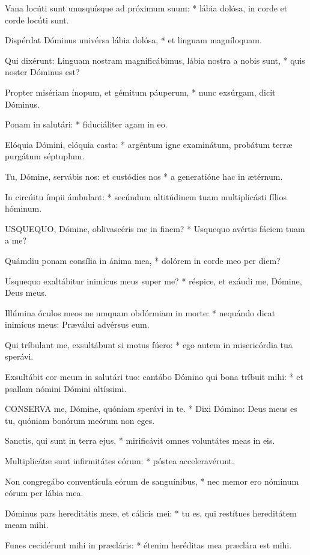 Vana locúti sunt unusquísque ad próximum suum: * lábia dolósa, in corde et corde locúti sunt.

Dispérdat Dóminus univérsa lábia dolósa, * et linguam magníloquam.

Qui dixérunt: Linguam nostram magnificábimus, lábia nostra a nobis sunt, * quis noster Dóminus est?

Propter misériam ínopum, et gémitum páuperum, * nunc exsúrgam, dicit Dóminus.

Ponam in salutári: * fiduciáliter agam in eo.

Elóquia Dómini, elóquia casta: * argéntum igne examinátum, probátum terræ purgátum séptuplum.

Tu, Dómine, servábis nos: et custódies nos * a generatióne hac in ætérnum.

In circúitu ímpii ámbulant: * secúndum altitúdinem tuam multiplicásti fílios hóminum.


\lettrine[lines=2]{U}{SQUEQUO}, Dómine, oblivascéris me in finem? * Usquequo avértis fáciem tuam a me?

Quámdiu ponam consília in ánima mea, * dolórem in corde meo per diem?

Usquequo exaltábitur inimícus meus super me? * réspice, et exáudi me, Dómine, Deus meus.

Illúmina óculos meos ne umquam obdórmiam in morte: * nequándo dicat inimícus meus: Præválui advérsus eum.

Qui tríbulant me, exsultábunt si motus fúero: * ego autem in misericórdia tua sperávi.

Exsultábit cor meum in salutári tuo: cantábo Dómino qui bona tríbuit mihi: * et psallam nómini Dómini altíssimi.


\lettrine[lines=2]{C}{ONSERVA} me, Dómine, quóniam sperávi in te. * Dixi Dómino: Deus meus es tu, quóniam bonórum meórum non eges.

Sanctis, qui sunt in terra ejus, * mirificávit omnes voluntátes meas in eis.

Multiplicátæ sunt infirmitátes eórum: * póstea acceleravérunt.

Non congregábo conventícula eórum de sanguínibus, * nec memor ero nóminum eórum per lábia mea.

Dóminus pars hereditátis meæ, et cálicis mei: * tu es, qui restítues hereditátem meam mihi.

Funes cecidérunt mihi in præcláris: * étenim heréditas mea præclára est mihi.


